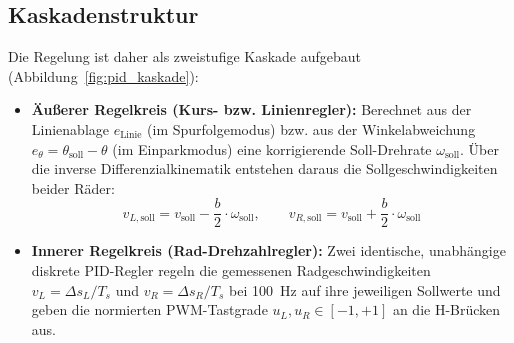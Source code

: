\subsection{Kaskadenstruktur}
Die Regelung ist daher als zweistufige Kaskade aufgebaut (Abbildung~\ref{fig:pid_kaskade}):
\begin{itemize}
  \item \textbf{Äußerer Regelkreis (Kurs- bzw. Linienregler):} Berechnet aus der Linienablage $e_{\mathrm{Linie}}$ (im Spurfolgemodus) bzw. aus der Winkelabweichung $e_\theta = \theta_{\mathrm{soll}} - \theta$ (im Einparkmodus) eine korrigierende Soll-Drehrate $\omega_{\mathrm{soll}}$. Über die inverse Differenzialkinematik entstehen daraus die Sollgeschwindigkeiten beider Räder:
  \begin{equation}
    v_{L,\mathrm{soll}} = v_{\mathrm{soll}} - \frac{b}{2} \cdot \omega_{\mathrm{soll}}, \qquad
    v_{R,\mathrm{soll}} = v_{\mathrm{soll}} + \frac{b}{2} \cdot \omega_{\mathrm{soll}}
    \label{eq:inv_kinematik}
  \end{equation}
  \item \textbf{Innerer Regelkreis (Rad-Drehzahlregler):} Zwei identische, unabhängige diskrete PID-Regler regeln die gemessenen Radgeschwindigkeiten $v_L = \Delta s_L / T_s$ und $v_R = \Delta s_R / T_s$ bei \qty{100}{\hertz} auf ihre jeweiligen Sollwerte und geben die normierten PWM-Tastgrade $u_L, u_R \in [-1, +1]$ an die H-Brücken aus.
\end{itemize}

